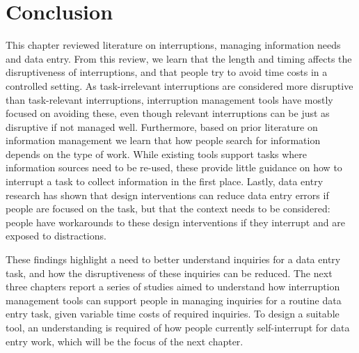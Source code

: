 \section{Conclusion}
This chapter reviewed literature on interruptions, managing information needs and data entry. From this review, we learn that the length and timing affects the disruptiveness of interruptions, and that people try to avoid time costs in a controlled setting. As task-irrelevant interruptions are considered more disruptive than task-relevant interruptions, interruption management tools have mostly focused on avoiding these, even though relevant interruptions can be just as disruptive if not managed well. Furthermore, based on prior literature on information management we learn that how people search for information depends on the type of work. While existing tools support tasks where information sources need to be re-used, these provide little guidance on how to interrupt a task to collect information in the first place. Lastly, data entry research has shown that design interventions can reduce data entry errors if people are focused on the task, but that the context needs to be considered: people have workarounds to these design interventions if they interrupt and are exposed to distractions.

These findings highlight a need to better understand inquiries for a data entry task, and how the disruptiveness of these inquiries can be reduced. The next three chapters report a series of studies aimed to understand how interruption management tools can support people in managing inquiries for a routine data entry task, given variable time costs of required inquiries. To design a suitable tool, an understanding is required of how people currently self-interrupt for data entry work, which will be the focus of the next chapter.



